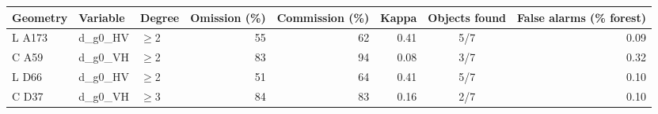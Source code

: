 \begin{tabular}{lllrrrcr}
\toprule
Geometry & Variable & Degree & Omission (\%) & Commission (\%) & Kappa & Objects found & False alarms (\% forest) \\
\midrule
L A173 & d\_g0\_HV & $\geq$2 & 55 & 62 & 0.41 & 5/7 & 0.09 \\
C A59 & d\_g0\_VH & $\geq$2 & 83 & 94 & 0.08 & 3/7 & 0.32 \\
L D66 & d\_g0\_HV & $\geq$2 & 51 & 64 & 0.41 & 5/7 & 0.10 \\
C D37 & d\_g0\_VH & $\geq$3 & 84 & 83 & 0.16 & 2/7 & 0.10 \\
\bottomrule
\end{tabular}
